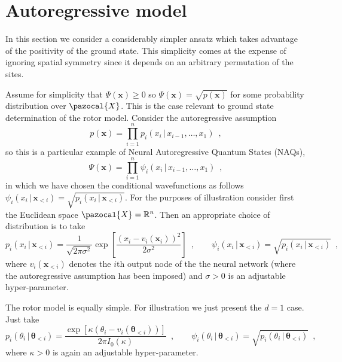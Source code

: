 \documentclass[12pt]{article}
\theoremstyle{definition}%
\theoremstyle{definition}
\theoremstyle{remark}
\begin{document}
\section{Autoregressive model}
In this section we consider a considerably simpler ansatz which takes advantage of the positivity of the ground state. This simplicity comes at the expense of ignoring spatial symmetry since it depends on an arbitrary permutation of the sites.

Assume for simplicity that $\Psi(\bm{x}) \geq 0$ so $\Psi(\bm{x}) = \sqrt{p(\bm{x})}$ for some probability distribution over $\pazocal{X}$. This is the case relevant to ground state determination of the rotor model. Consider the autoregressive assumption
\begin{equation}
	p(\bm{x}) = \prod_{i=1}^n p_i(x_i \, | \, x_{i-1}, \ldots, x_1) \enspace ,
\end{equation}
so this is a particular example of Neural Autoregressive Quantum States (NAQs),
\begin{equation}
	\Psi(\bm{x}) = \prod_{i=1}^n \psi_i(x_i \, | \, x_{i-1}, \ldots, x_1) \enspace ,
\end{equation}
in which we have chosen the conditional wavefunctions as follows $\psi_i(x_i \, | \, \bm{x}_{<i}) = \sqrt{p_i(x_i \, | \, \bm{x}_{<i})}$. For the purposes of illustration consider first the Euclidean space $\pazocal{X} = \mathbb{R}^n$. Then an appropriate choice of distribution is to take
\begin{equation}
	p_i(x_i \, | \, \bm{x}_{<i}) = \frac{1}{\sqrt{2\pi \sigma^2}} \exp\left[\frac{(x_i - v_i(\bm{x}_i))^2}{2\sigma^2}\right] \enspace , \quad \quad \psi_i(x_i \, | \, \bm{x}_{<i}) = \sqrt{p_i(x_i \, | \, \bm{x}_{<i})} \enspace ,
\end{equation}
where $v_i(\bm{x}_{<i})$ denotes the $i$th output node of the the neural network (where the autoregressive assumption has been imposed) and $\sigma > 0$ is an adjustable hyper-parameter.

The rotor model is equally simple. For illustration we just present the $d=1$ case. Just take
\begin{equation}
	p_i(\theta_i \, | \, \bm{\theta}_{<i}) = \frac{\exp\left[ \kappa (\theta_i - v_i(\bm{\theta}_{<i})) \right]}{2\pi I_0(\kappa)} \enspace , \quad \quad \psi_i(\theta_i \, | \, \bm{\theta}_{<i}) = \sqrt{p_i(\theta_i \, | \, \bm{\theta}_{<i})} \enspace ,
\end{equation}
where $\kappa > 0$ is again an adjustable hyper-parameter.
\end{document}
